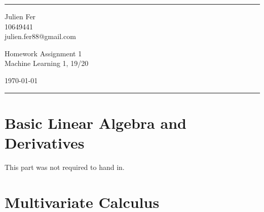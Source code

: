 \documentclass[a4paper]{article}
\begin{document}

\fancyhead[C]{}
\hrule \medskip %
\begin{minipage}{0.295\textwidth} 
\raggedright
\footnotesize
Julien Fer \hfill\\   
10649441\hfill\\
julien.fer88@gmail.com
\end{minipage}
\begin{minipage}{0.4\textwidth} 
\centering 
\large 
Homework Assignment 1\\ 
\normalsize 
Machine Learning 1, 19/20\\ 
\end{minipage}
\begin{minipage}{0.295\textwidth} 
\raggedleft
\today\hfill\\
\end{minipage}
\medskip\hrule 
\bigskip


\section{Basic Linear Algebra and Derivatives}
This part was not required to hand in.




\section{Multivariate Calculus}
\end{document}
